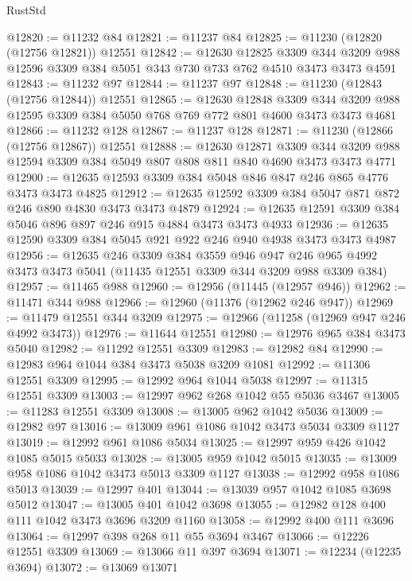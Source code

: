 \begin{lexlean}{RustStd}
\begin{coremodule}
{{{{{{{{{{{{{{{{{{{@12820 := @11232 @84
@12821 := @11237 @84
@12825 := @11230 (@12820 (@12756 @12821)) @12551
@12842 := @12630
    @12825
    @3309
    @344
    @3209
    @988
    @12596
    @3309
    @384
    @5051
    @343
    @730
    @733
    @762
    @4510
    @3473
    @3473
    @4591
@12843 := @11232 @97
@12844 := @11237 @97
@12848 := @11230 (@12843 (@12756 @12844)) @12551
@12865 := @12630
    @12848
    @3309
    @344
    @3209
    @988
    @12595
    @3309
    @384
    @5050
    @768
    @769
    @772
    @801
    @4600
    @3473
    @3473
    @4681
@12866 := @11232 @128
@12867 := @11237 @128
@12871 := @11230 (@12866 (@12756 @12867)) @12551
@12888 := @12630
    @12871
    @3309
    @344
    @3209
    @988
    @12594
    @3309
    @384
    @5049
    @807
    @808
    @811
    @840
    @4690
    @3473
    @3473
    @4771
@12900 := @12635 @12593 @3309 @384 @5048 @846 @847 @246 @865 @4776 @3473 @3473 @4825
@12912 := @12635 @12592 @3309 @384 @5047 @871 @872 @246 @890 @4830 @3473 @3473 @4879
@12924 := @12635 @12591 @3309 @384 @5046 @896 @897 @246 @915 @4884 @3473 @3473 @4933
@12936 := @12635 @12590 @3309 @384 @5045 @921 @922 @246 @940 @4938 @3473 @3473 @4987
@12956 := @12635
    @246
    @3309
    @384
    @3559
    @946
    @947
    @246
    @965
    @4992
    @3473
    @3473
    @5041
    (@11435 @12551 @3309 @344 @3209 @988 @3309 @384)
@12957 := @11465 @988
@12960 := @12956 (@11445 (@12957 @946))
@12962 := @11471 @344 @988
@12966 := @12960 (@11376 (@12962 @246 @947))
@12969 := @11479 @12551 @344 @3209
@12975 := @12966 (@11258 (@12969 @947 @246 @4992 @3473))
@12976 := @11644 @12551
@12980 := @12976 @965 @384 @3473 @5040
@12982 := @11292 @12551 @3309
@12983 := @12982 @84
@12990 := @12983 @964 @1044 @384 @3473 @5038 @3209 @1081
@12992 := @11306 @12551 @3309
@12995 := @12992 @964 @1044 @5038
@12997 := @11315 @12551 @3309
@13003 := @12997 @962 @268 @1042 @55 @5036 @3467
@13005 := @11283 @12551 @3309
@13008 := @13005 @962 @1042 @5036
@13009 := @12982 @97
@13016 := @13009 @961 @1086 @1042 @3473 @5034 @3309 @1127
@13019 := @12992 @961 @1086 @5034
@13025 := @12997 @959 @426 @1042 @1085 @5015 @5033
@13028 := @13005 @959 @1042 @5015
@13035 := @13009 @958 @1086 @1042 @3473 @5013 @3309 @1127
@13038 := @12992 @958 @1086 @5013
@13039 := @12997 @401
@13044 := @13039 @957 @1042 @1085 @3698 @5012
@13047 := @13005 @401 @1042 @3698
@13055 := @12982 @128 @400 @111 @1042 @3473 @3696 @3209 @1160
@13058 := @12992 @400 @111 @3696
@13064 := @12997 @398 @268 @11 @55 @3694 @3467
@13066 := @12226 @12551 @3309
@13069 := @13066 @11 @397 @3694
@13071 := @12234 (@12235 @3694)
@13072 := @13069 @13071
}}}}}}}}}}}}}}}}}}}
\end{coremodule}
\end{lexlean}
